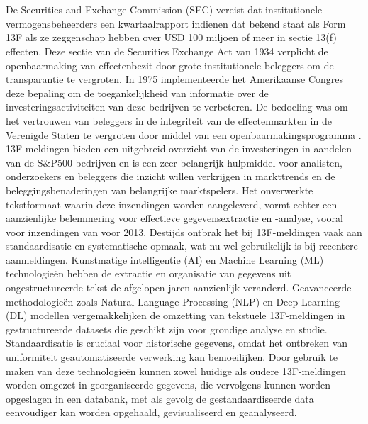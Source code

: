 \chapter{}%
\label{ch:stand-van-zaken}





De Securities and Exchange Commission (SEC) vereist dat institutionele vermogensbeheerders een kwartaalrapport indienen dat bekend staat als Form 13F als ze zeggenschap hebben over USD 100 miljoen of meer in sectie 13(f) effecten. Deze sectie van de Securities Exchange Act van 1934 verplicht de openbaarmaking van effectenbezit door grote institutionele beleggers om de transparantie te vergroten. In 1975 implementeerde het Amerikaanse Congres deze bepaling om de toegankelijkheid van informatie over de investeringsactiviteiten van deze bedrijven te verbeteren. De bedoeling was om het vertrouwen van beleggers in de integriteit van de effectenmarkten in de Verenigde Staten te vergroten door middel van een openbaarmakingsprogramma \textcite{SECform13F2024}.
13F-meldingen bieden een uitgebreid overzicht van de investeringen in aandelen van  de S\&P500 bedrijven en is een zeer belangrijk hulpmiddel voor analisten, onderzoekers en beleggers die inzicht willen verkrijgen in markttrends en de beleggingsbenaderingen van belangrijke marktspelers. Het onverwerkte tekstformaat waarin deze inzendingen worden aangeleverd, vormt echter een aanzienlijke belemmering voor effectieve gegevensextractie en -analyse, vooral voor inzendingen van voor 2013. Destijds ontbrak het bij 13F-meldingen vaak aan standaardisatie en systematische opmaak, wat nu wel gebruikelijk is bij recentere aanmeldingen.
Kunstmatige intelligentie (AI) en Machine Learning (ML) technologieën hebben de extractie en organisatie van gegevens uit ongestructureerde tekst de afgelopen jaren aanzienlijk veranderd. Geavanceerde methodologieën zoals Natural Language Processing (NLP) en Deep Learning (DL) modellen vergemakkelijken de omzetting van tekstuele 13F-meldingen in gestructureerde datasets die geschikt zijn voor grondige analyse en studie. Standaardisatie is cruciaal voor historische gegevens, omdat het ontbreken van uniformiteit geautomatiseerde verwerking kan bemoeilijken. Door gebruik te maken van deze technologieën kunnen zowel huidige als oudere 13F-meldingen worden omgezet in georganiseerde gegevens, die vervolgens kunnen worden opgeslagen in een databank, met als gevolg de gestandaardiseerde data eenvoudiger kan worden opgehaald, gevisualiseerd en geanalyseerd.

